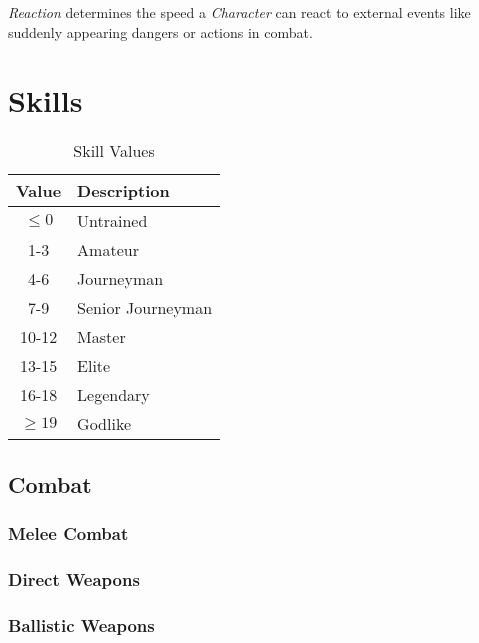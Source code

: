 \emph{Reaction} determines the speed a \emph{Character} can react to external
events like suddenly appearing dangers or actions in combat.


\section{Skills}

\begin{table}[htb]
    \caption[Skill Values]{Skill Values}
    \label{tab:skill values}
    \centering
    \begin{tabular}{cl}
        \toprule
        \textbf{Value} & \textbf{Description} \\
        \midrule
        $\le 0$        & Untrained            \\
        1-3            & Amateur              \\
        4-6            & Journeyman           \\
        7-9            & Senior Journeyman    \\
        10-12          & Master               \\
        13-15          & Elite                \\
        16-18          & Legendary            \\
        $\ge 19$       & Godlike              \\
        \bottomrule
    \end{tabular}
\end{table}

\subsection{Combat}

\subsubsection{Melee Combat}

\subsubsection{Direct Weapons}

\subsubsection{Ballistic Weapons}

